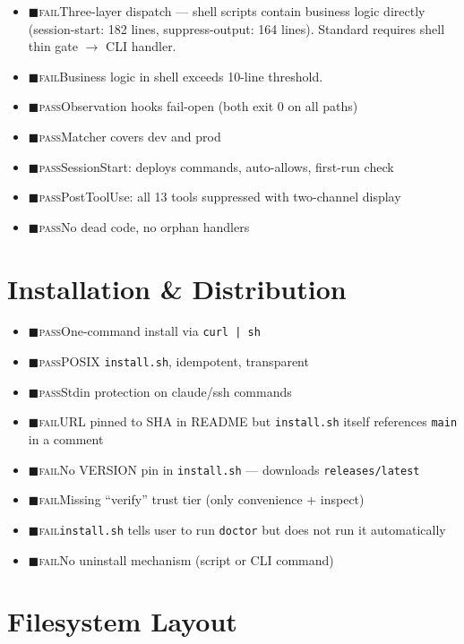 \documentclass[a4paper,10pt]{article}
\newcommand{\pass}{{\color{green!60!black}$\blacksquare$\hspace{0.4em}\textsc{pass}}\hspace{0.5em}}
\newcommand{\fail}{{\color{red!70!black}$\blacksquare$\hspace{0.4em}\textsc{fail}}\hspace{0.5em}}
\begin{document}
\begin{itemize}
  \item \fail Three-layer dispatch --- shell scripts contain business logic
    directly (session-start: 182 lines, suppress-output: 164 lines).
    Standard requires shell thin gate $\to$ CLI handler.
  \item \fail Business logic in shell exceeds 10-line threshold.
  \item \pass Observation hooks fail-open (both exit 0 on all paths)
  \item \pass Matcher covers dev and prod
  \item \pass SessionStart: deploys commands, auto-allows, first-run check
  \item \pass PostToolUse: all 13 tools suppressed with two-channel display
  \item \pass No dead code, no orphan handlers
\end{itemize}

% 
\section{Installation \& Distribution}

\begin{itemize}
  \item \pass One-command install via \texttt{curl | sh}
  \item \pass POSIX \texttt{install.sh}, idempotent, transparent
  \item \pass Stdin protection on claude/ssh commands
  \item \fail URL pinned to SHA in README but \texttt{install.sh} itself
    references \texttt{main} in a comment
  \item \fail No VERSION pin in \texttt{install.sh} --- downloads
    \texttt{releases/latest}
  \item \fail Missing ``verify'' trust tier (only convenience + inspect)
  \item \fail \texttt{install.sh} tells user to run \texttt{doctor} but
    does not run it automatically
  \item \fail No uninstall mechanism (script or CLI command)
\end{itemize}

% 
\section{Filesystem Layout}
\end{document}
